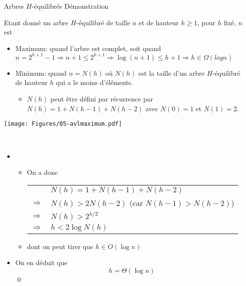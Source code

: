 \begin{frame}{Arbres $H$-équilibrés}
\alert{Démonstration}

Etant donné un arbre $H$-équilibré de taille $n$ et de hauteur $h\geq 1$, pour $h$ fixé, $n$ est
\begin{itemize}
\item Maximum: quand l'arbre est complet, soit quand
$n=2^{h+1}-1\Rightarrow n+1\leq 2^{h+1} \Rightarrow \log (n+1)\leq h+1 \Rightarrow h\in\Omega(log n) $
\item Minimum: quand $n=N(h)$ où $N(h)$ est la taille d'un arbre $H$-équilibré de hauteur $h$ qui a le moins d'éléments.
\begin{itemize}
\item $N(h)$ peut être défini par récurrence par $N(h)=1+N(h-1)+N(h-2)$ avec $N(0)=1$ et $N(1)=2$.
\end{itemize}
\end{itemize}
\centerline{\texttt{[image: Figures/05-avlmaximum.pdf]}}


\end{frame}

\begin{frame}{~}%
\begin{itemize}
\item[]
\begin{itemize}
\item On a donc\\
\begin{tabular}{cl}
& $N(h)=1+N(h-1)+N(h-2)$\\
$\Rightarrow$ & $N(h)>2 N(h-2)$ (car $N(h-1)>N(h-2)$)\\
$\Rightarrow$ & $N(h)>2^{h/2}$\\
$\Rightarrow$ & $h< 2\log N(h)$\\
\end{tabular}
\item dont on peut tirer que
$h\in O(\log n)$
\end{itemize}
\item On en déduit que
$$h=\Theta(\log n)$$\qed
\end{itemize}

\end{frame}

